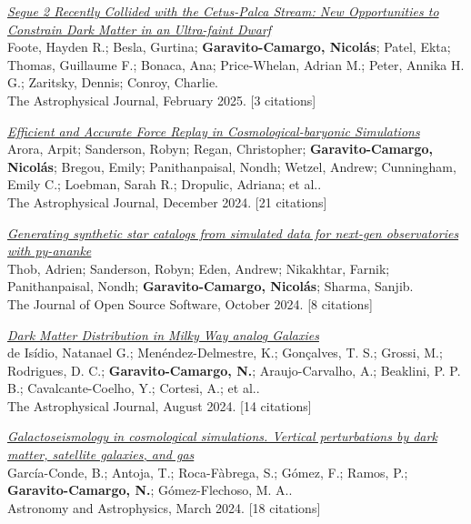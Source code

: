 \documentclass[14pt]{article}
\begin{document}
\begin{etaremune}
\item \textit{\href{https://ui.adsabs.harvard.edu/abs/2025ApJ...979..171F/abstract}{Segue 2 Recently Collided with the Cetus-Palca Stream: New Opportunities to Constrain Dark Matter in an Ultra-faint Dwarf}}\\
  {\small \color{darkgray} Foote, Hayden R.; Besla, Gurtina; \textbf{Garavito-Camargo, Nicolás}; Patel, Ekta; Thomas, Guillaume F.; Bonaca, Ana; Price-Whelan, Adrian M.; Peter, Annika H. G.; Zaritsky, Dennis; Conroy, Charlie.\\
  The Astrophysical Journal, February 2025. [3 citations]}

\item \textit{\href{https://ui.adsabs.harvard.edu/abs/2024ApJ...977...23A/abstract}{Efficient and Accurate Force Replay in Cosmological-baryonic Simulations}}\\
  {\small \color{darkgray} Arora, Arpit; Sanderson, Robyn; Regan, Christopher; \textbf{Garavito-Camargo, Nicolás}; Bregou, Emily; Panithanpaisal, Nondh; Wetzel, Andrew; Cunningham, Emily C.; Loebman, Sarah R.; Dropulic, Adriana; et al..\\
  The Astrophysical Journal, December 2024. [21 citations]}

\item \textit{\href{https://ui.adsabs.harvard.edu/abs/2024JOSS....9.6234T/abstract}{Generating synthetic star catalogs from simulated data for next-gen observatories with py-ananke}}\\
  {\small \color{darkgray} Thob, Adrien; Sanderson, Robyn; Eden, Andrew; Nikakhtar, Farnik; Panithanpaisal, Nondh; \textbf{Garavito-Camargo, Nicolás}; Sharma, Sanjib.\\
  The Journal of Open Source Software, October 2024. [8 citations]}

\item \textit{\href{https://ui.adsabs.harvard.edu/abs/2024ApJ...971...69D/abstract}{Dark Matter Distribution in Milky Way analog Galaxies}}\\
  {\small \color{darkgray} de Isídio, Natanael G.; Menéndez-Delmestre, K.; Gonçalves, T. S.; Grossi, M.; Rodrigues, D. C.; \textbf{Garavito-Camargo, N.}; Araujo-Carvalho, A.; Beaklini, P. P. B.; Cavalcante-Coelho, Y.; Cortesi, A.; et al..\\
  The Astrophysical Journal, August 2024. [14 citations]}

\item \textit{\href{https://ui.adsabs.harvard.edu/abs/2024A&A...683A..47G/abstract}{Galactoseismology in cosmological simulations. Vertical perturbations by dark matter, satellite galaxies, and gas}}\\
  {\small \color{darkgray} García-Conde, B.; Antoja, T.; Roca-Fàbrega, S.; Gómez, F.; Ramos, P.; \textbf{Garavito-Camargo, N.}; Gómez-Flechoso, M. A..\\
  Astronomy and Astrophysics, March 2024. [18 citations]}


\end{etaremune}
\end{document}
